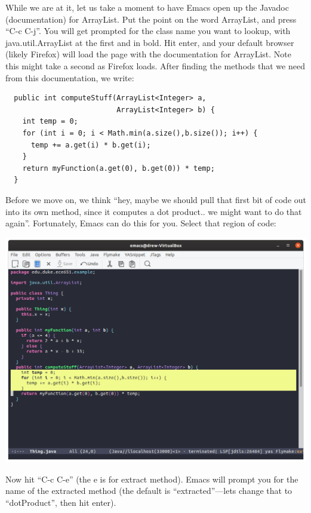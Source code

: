 \documentclass[12pt]{article}
\begin{document}
While we are at it, let us take a moment to have Emacs open up the
Javadoc (documentation) for ArrayList. Put the point on the word
ArrayList, and press ``C-c C-j''.  You will get prompted for the
class name you want to lookup, with java.util.ArrayList at the first
and in bold. Hit enter, and your default browser (likely Firefox) will
load the page with the documentation for ArrayList. Note this might
take a second as Firefox loads.  After finding the methods
that we need from this documentation, we write:

\begin{verbatim}
  public int computeStuff(ArrayList<Integer> a, 
                          ArrayList<Integer> b) {
    int temp = 0;
    for (int i = 0; i < Math.min(a.size(),b.size()); i++) {
      temp += a.get(i) * b.get(i);
    }
    return myFunction(a.get(0), b.get(0)) * temp;
  }
\end{verbatim}


Before we move on, we think ``hey, maybe we should pull that first bit
of code out into its own method, since it computes a dot product.. we
might want to do that again''.  Fortunately, Emacs can do this for you.
Select that region of code:

\begin{center}
  \includegraphics[width=5.5in]{emacs-em-pre.png}
\end{center}

Now hit ``C-c C-e'' (the e is for extract method).  Emacs will prompt
you for the name of the extracted method (the default is
``extracted''---lets change that to ``dotProduct'', then hit enter).
\end{document}
